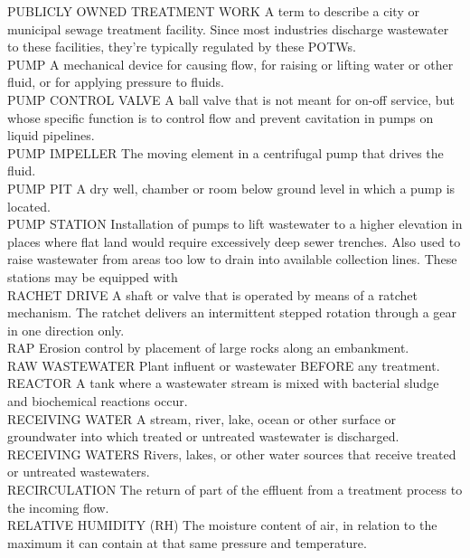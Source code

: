 PUBLICLY OWNED TREATMENT WORK
A term to describe a city or municipal sewage treatment facility. Since most industries discharge wastewater to these facilities, they’re typically regulated by these POTWs.
\vspace{0.3cm}\\
PUMP
A mechanical device for causing flow, for raising or lifting water or other fluid, or for applying pressure to fluids. 
\vspace{0.3cm}\\
PUMP CONTROL VALVE
A ball valve that is not meant for on-off service, but whose specific function is to control flow and prevent cavitation in pumps on liquid pipelines.
\vspace{0.3cm}\\
PUMP IMPELLER
The moving element in a centrifugal pump that drives the fluid.
\vspace{0.3cm}\\
PUMP PIT
A dry well, chamber or room below ground level in which a pump is located. 
\vspace{0.3cm}\\
PUMP STATION
Installation of pumps to lift wastewater to a higher elevation in places where flat land would require excessively deep sewer trenches. Also used to raise wastewater from areas too low to drain into available collection lines. These stations may be equipped with 
\vspace{0.3cm}\\
RACHET DRIVE
A shaft or valve that is operated by means of a ratchet mechanism. The ratchet delivers an intermittent stepped rotation through a gear in one direction only.
\vspace{0.3cm}\\
RAP
Erosion control by placement of large rocks along an embankment.
\vspace{0.3cm}\\
RAW WASTEWATER
Plant influent or wastewater BEFORE any treatment.
\vspace{0.3cm}\\
REACTOR
A tank where a wastewater stream is mixed with bacterial sludge and biochemical reactions occur.
\vspace{0.3cm}\\
RECEIVING WATER
A stream, river, lake, ocean or other surface or groundwater into which treated or untreated wastewater is discharged.
\vspace{0.3cm}\\
RECEIVING WATERS
Rivers, lakes, or other water sources that receive treated or untreated wastewaters.
\vspace{0.3cm}\\
RECIRCULATION
The return of part of the effluent from a treatment process to the incoming flow.
\vspace{0.3cm}\\
RELATIVE HUMIDITY (RH)
The moisture content of air, in relation to the maximum it can contain at that same pressure and temperature.
\vspace{0.3cm}\\

